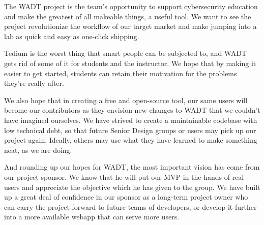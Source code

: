 \documentclass[../design-document.tex]{subfiles}
\begin{document}
The WADT project is the team's opportunity to support cybersecurity education and make the greatest of all makeable things, a useful tool. We want to see the project revolutionize the workflow of our target market and make jumping into a lab as quick and easy as one-click shipping.

Tedium is the worst thing that smart people can be subjected to, and WADT gets rid of some of it for students and the instructor. We hope that by making it easier to get started, students can retain their motivation for the problems they're really after.

We also hope that in creating a free and open-source tool, our same users will become our contributors as they envision new changes to WADT that we couldn't have imagined ourselves. We have strived to create a maintainable codebase with low technical debt, so that future Senior Design groups or users may pick up our project again. Ideally, others may use what they have learned to make something neat, as we are doing.

And rounding up our hopes for WADT, the most important vision has come from our project sponsor. We know that he will put our MVP in the hands of real users and appreciate the objective which he has given to the group. We have built up a great deal of confidence in our sponsor as a long-term project owner who can carry the project forward to future teams of developers, or develop it further into a more available webapp that can serve more users.
\end{document}
